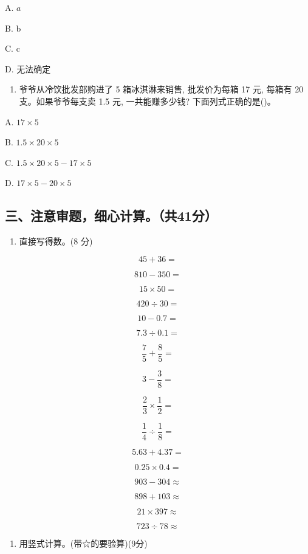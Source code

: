 \documentclass[
  10
]{article}
\providecommand{\tightlist}{%
  \setlength{\itemsep}{0pt}\setlength{\parskip}{0pt}}
\begin{document}
A. \(a\)

B. b

C. c

D. 无法确定

\begin{enumerate}
\def\labelenumi{\arabic{enumi}.}
\setcounter{enumi}{4}
\tightlist
\item
  爷爷从冷饮批发部购进了 5 箱冰淇淋来销售, 批发价为每箱 17 元, 每箱有 20
  支。如果爷爷每支卖 1.5 元, 一共能赚多少钱? 下面列式正确的是()。
\end{enumerate}

A. \(17 \times 5\)

B. \(1.5 \times 20 \times 5\)

C. \(1.5 \times 20 \times 5 - 17 \times 5\)

D. \(17 \times 5 - 20 \times 5\)

\subsection{三、注意审题，细心计算。（共41分）}\label{ux4e09ux6ce8ux610fux5ba1ux9898ux7ec6ux5fc3ux8ba1ux7b97ux517141ux5206}

\begin{enumerate}
\def\labelenumi{\arabic{enumi}.}
\tightlist
\item
  直接写得数。(8 分)
\end{enumerate}

\[
4 5 + 3 6 =
\]

\[
8 1 0 - 3 5 0 =
\]

\[
1 5 \times 5 0 =
\]

\[
4 2 0 \div 3 0 =
\]

\[
1 0 - 0. 7 =
\]

\[
7. 3 \div 0. 1 =
\]

\[
\frac {7}{5} + \frac {8}{5} =
\]

\[
3 - \frac {3}{8} =
\]

\[
\frac {2}{3} \times \frac {1}{2} =
\]

\[
\frac {1}{4} \div \frac {1}{8} =
\]

\[
5. 6 3 + 4. 3 7 =
\]

\[
0. 2 5 \times 0. 4 =
\]

\[
9 0 3 - 3 0 4 \approx
\]

\[
8 9 8 + 1 0 3 \approx
\]

\[
2 1 \times 3 9 7 \approx
\]

\[
7 2 3 \div 7 8 \approx
\]

\begin{enumerate}
\def\labelenumi{\arabic{enumi}.}
\setcounter{enumi}{1}
\tightlist
\item
  用竖式计算。(带☆的要验算)(9分)
\end{enumerate}
\end{document}

